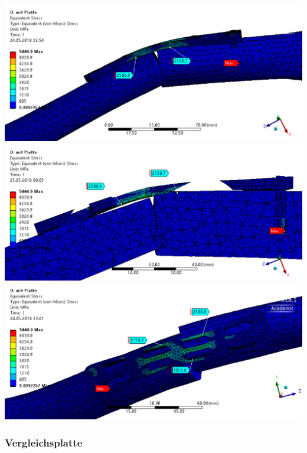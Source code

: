 		\begin{Figure}
			\centering
			\includegraphics[width=15cm]{content/images/stress_side.png}
			\includegraphics[width=15cm]{content/images/stress_side_profile.png}
			\includegraphics[width=15cm]{content/images/stress_top.png}
			\label{fig:stress_side}
		\end{Figure}
		
		\subsubsection{Vergleichsplatte}
		
